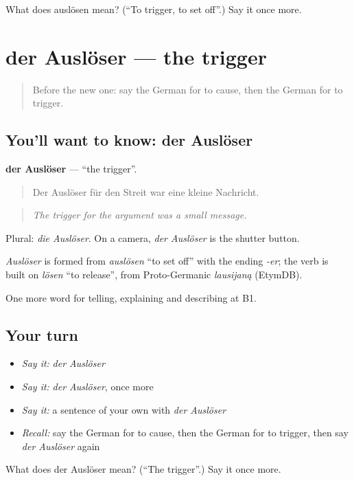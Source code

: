 \begin{tcolorbox}[breakable,colback=teal!4,colframe=teal!35!black,title={Before you move on}]
What does auslösen mean? (\textquotedblleft{}To trigger, to set off\textquotedblright{}.) Say it once more.
\end{tcolorbox}
\section[der Auslöser]{der Auslöser — the trigger}

\label{lesson:GE-C342-ausloeser}



\begin{quote}
Before the new one: say the German for to cause, then the German for to trigger.
\end{quote}

\subsection*{You'll want to know: der Auslöser}
\textbf{der Auslöser} — \textquotedblleft{}the trigger\textquotedblright{}.

\begin{quote}
Der Auslöser für den Streit war eine kleine Nachricht.
\end{quote}

\begin{quote}
\emph{The trigger for the argument was a small message.}
\end{quote}

Plural: \emph{die Auslöser}. On a camera, \emph{der Auslöser} is the shutter button.

\begin{cousinweb}
\emph{Auslöser} is formed from \emph{auslösen} \textquotedblleft{}to set off\textquotedblright{} with the ending \emph{-er}; the verb is built on \emph{lösen} \textquotedblleft{}to release\textquotedblright{}, from Proto-Germanic \emph{lausijaną} (EtymDB).
\end{cousinweb}

\begin{grammarlens}[title={What you've built}]
One more word for telling, explaining and describing at B1.
\end{grammarlens}

\subsection*{Your turn}
\begin{itemize}
\raggedright
  \item \emph{Say it:} \emph{der Auslöser}
  \item \emph{Say it:} \emph{der Auslöser}, once more
  \item \emph{Say it:} a sentence of your own with \emph{der Auslöser}
  \item \emph{Recall:} say the German for to cause, then the German for to trigger, then say \emph{der Auslöser} again
\end{itemize}

\begin{tcolorbox}[breakable,colback=teal!4,colframe=teal!35!black,title={Before you move on}]
What does der Auslöser mean? (\textquotedblleft{}The trigger\textquotedblright{}.) Say it once more.
\end{tcolorbox}
